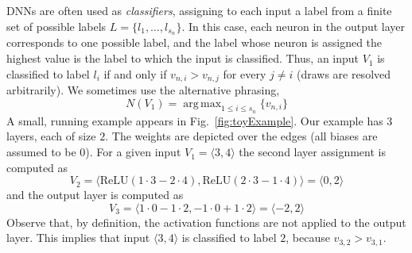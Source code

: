 \documentclass{easychair}
\DeclareMathOperator*{\argmax}{arg\,max}
\newcommand{\relu}{\text{ReLU}\xspace{}}
\begin{document}
DNNs are often used as \emph{classifiers}, assigning to each input a
label from a finite set of possible labels $L=\{l_1,\ldots,l_{s_n}\}$. In this case, each neuron
in the output layer corresponds to one possible label, and the label
whose neuron is assigned the highest value is the label to which the
input is classified. Thus, an input $V_1$ is classified to label $l_i$
if and only if $v_{n,i}>v_{n,j}$ for every $j\neq i$ (draws are
resolved arbitrarily). We sometimes use the alternative phrasing,
\[
  N(V_1) = \argmax_{1\leq i\leq s_n}\{v_{n,i}\}
\]
A small, running example appears in Fig.~\ref{fig:toyExample}. Our
example has $3$ layers, each of size $2$. The weights are depicted
over the edges (all biases are assumed to be 0). For a given input
$V_1=\langle 3, 4 \rangle$ the second layer assignment is computed as
\[
  V_2=\langle \relu{}(1\cdot 3-2\cdot 4),\relu{}(2\cdot 3-1\cdot
  4)\rangle = \langle 0,2 \rangle
 \]
 and the output layer is computed as
 \[
   V_3= \langle 1 \cdot 0 -1 \cdot 2, -1 \cdot 0 +1  \cdot 2\rangle =
   \langle -2, 2 \rangle
 \]
 Observe that, by definition, the \relu{} activation functions are not applied to the
 output layer. This implies that input $\langle 3, 4\rangle$ is
 classified to label $2$, because $v_{3,2}> v_{3,1}$.
\end{document}
